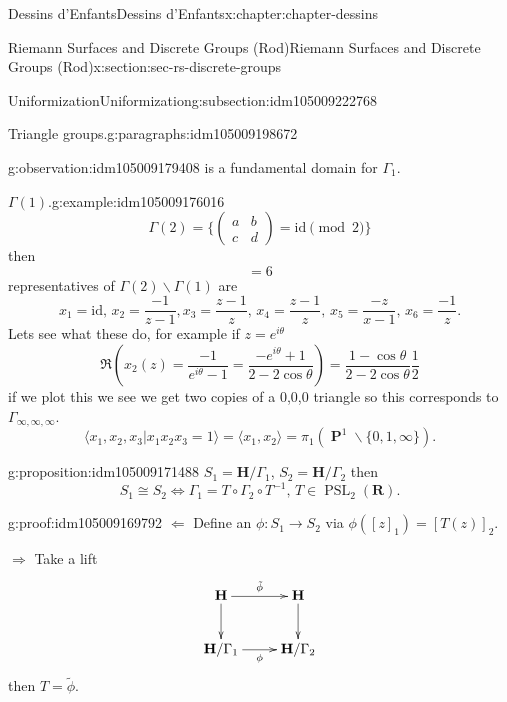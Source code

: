 \documentclass[oneside,10pt,]{book}
\numberwithin{equation}{section}
\newcommand{\inv}{^{-1}}
\newcommand{\lb}{[}
\newcommand{\rb}{]}
\newcommand{\RR}{\mathbf{R}}
\newcommand{\HH}{\mathbf{H}}
\newcommand{\id}{\mathrm{id}}
\DeclareMathOperator{\PP}{\mathbf{P}}
\DeclareMathOperator{\PSL}{PSL}
\newcommand{\amp}{&}
\begin{document}
\begin{chapterptx}{Dessins d'Enfants}{}{Dessins d'Enfants}{}{}{x:chapter:chapter-dessins}
\begin{sectionptx}{Riemann Surfaces and Discrete Groups (Rod)}{}{Riemann Surfaces and Discrete Groups (Rod)}{}{}{x:section:sec-rs-discrete-groups}
\begin{subsectionptx}{Uniformization}{}{Uniformization}{}{}{g:subsection:idm105009222768}
\begin{paragraphs}{Triangle groups.}{g:paragraphs:idm105009198672}
\begin{observation}{}{g:observation:idm105009179408}
is a fundamental domain for \(\Gamma_1\).%
\end{observation}
\begin{example}{\(\Gamma(1)\).}{g:example:idm105009176016}%
%
\begin{equation*}
\Gamma(2) = \{\begin{pmatrix} a\amp b \\ c\amp d\end{pmatrix} = \id \pmod 2 \}
\end{equation*}
then%
\begin{equation*}
[\Gamma(1) : \Gamma(2)] = 6
\end{equation*}
representatives of \(\Gamma(2) \backslash \Gamma(1)\) are%
\begin{equation*}
x_1 = \id,\,x_2 = \frac{-1}{z-1}, x_3 = \frac{z-1}{z},\, x_4 = \frac{z-1}{z},\,x_5 = \frac{-z}{x-1},\,x_6 = \frac{-1}{z}\text{.}
\end{equation*}
Lets see what these do, for example if \(z= e^{i\theta}\)%
\begin{equation*}
\Re(x_2(z) = \frac{-1}{e^{i\theta} - 1} = \frac{-e^{i\theta} + 1}{2- 2\cos \theta}) = \frac{1-\cos \theta}{ 2- 2\cos \theta} \frac 12
\end{equation*}
if we plot this we see we get two copies of a 0,0,0 triangle so this corresponds to \(\Gamma_{\infty,\infty,\infty}\).%
\begin{equation*}
\langle x_1, x_2, x_3 | x_1x_2x_3 = 1\rangle = \langle x_1,x_2\rangle = \pi_1(\PP^1\smallsetminus\{0,1,\infty\})\text{.}
\end{equation*}
%
\end{example}
\begin{proposition}{}{}{g:proposition:idm105009171488}%
\(S_1 = \HH/ \Gamma_1\), \(S_2 = \HH/\Gamma_2\) then%
\begin{equation*}
S_1 \cong S_2 \iff \Gamma_1 = T\circ \Gamma_2 \circ T\inv,\,T\in \PSL_2(\RR)\text{.}
\end{equation*}
%
\end{proposition}
\begin{proofptx}{}{g:proof:idm105009169792}
\(\Leftarrow\) Define an \(\phi\colon S_1 \to S_2\) via \(\phi(\lb z\rb_1) = \lb T(z)\rb_2\).%
\par
\(\Rightarrow\) Take a lift%
\begin{equation*}
\xymatrix{
\HH\ar[r]^{\tilde\phi}\ar[d] & \HH\ar[d] \\
\HH/\Gamma_1\ar[r]_\phi & \HH/\Gamma_2
}
\end{equation*}
then \(T= \tilde \phi\).%

\end{proofptx}
\end{paragraphs}
\end{subsectionptx}
\end{sectionptx}
\end{chapterptx}
\end{document}
